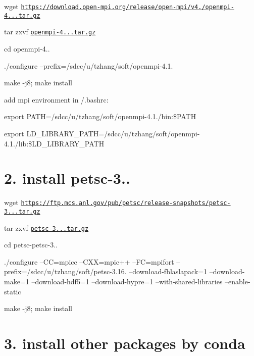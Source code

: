 
\begin{DoxyItemize}
\item wget \href{https://download.open-mpi.org/release/open-mpi/v4.1/openmpi-4.1.1.tar.gz}{\tt https\+://download.\+open-\/mpi.\+org/release/open-\/mpi/v4./openmpi-\/4...\+tar.\+gz}
\item tar zxvf \href{https://download.open-mpi.org/release/open-mpi/v4.1/openmpi-4.1.1.tar.gz}{\tt openmpi-\/4...\+tar.\+gz}
\item cd openmpi-\/4..
\item ./configure --prefix=/sdcc/u/tzhang/soft/openmpi-\/4.1.
\item make -\/j8; make install
\item add mpi environment in /.bashrc\+:
\begin{DoxyItemize}
\item export P\+A\+TH=/sdcc/u/tzhang/soft/openmpi-\/4.1./bin\+:\$\+P\+A\+TH
\item export L\+D\+\_\+\+L\+I\+B\+R\+A\+R\+Y\+\_\+\+P\+A\+TH=/sdcc/u/tzhang/soft/openmpi-\/4.1./lib\+:\$\+L\+D\+\_\+\+L\+I\+B\+R\+A\+R\+Y\+\_\+\+P\+A\+TH
\end{DoxyItemize}
\end{DoxyItemize}

\section*{2. install petsc-\/3..}


\begin{DoxyItemize}
\item wget \href{https://ftp.mcs.anl.gov/pub/petsc/release-snapshots/petsc-3.16.0.tar.gz}{\tt https\+://ftp.\+mcs.\+anl.\+gov/pub/petsc/release-\/snapshots/petsc-\/3...\+tar.\+gz}
\item tar zxvf \href{https://ftp.mcs.anl.gov/pub/petsc/release-snapshots/petsc-3.16.0.tar.gz}{\tt petsc-\/3...\+tar.\+gz}
\item cd petsc-\/petsc-\/3..
\item ./configure --CC=mpicc --C\+XX=mpic++ --FC=mpifort --prefix=/sdcc/u/tzhang/soft/petsc-\/3.16. --download-\/fblaslapack=1 --download-\/make=1 --download-\/hdf5=1 --download-\/hypre=1 --with-\/shared-\/libraries --enable-\/static
\item make -\/j8; make install
\end{DoxyItemize}

\section*{3. install other packages by conda}


